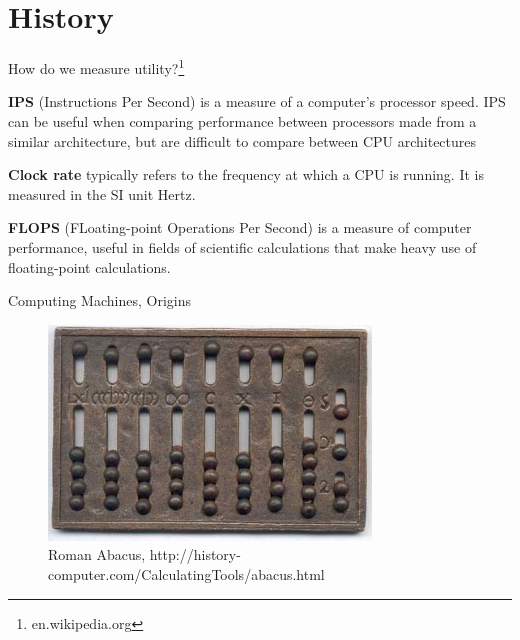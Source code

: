 \documentclass[xcolor=x11names,compress]{beamer}
\renewcommand{\(}{\begin{columns}}
\renewcommand{\)}{\end{columns}}
\newcommand{\<}[1]{\begin{column}{#1}}
\renewcommand{\>}{\end{column}}
\begin{document}
\section{History}
\begin{frame}{How do we measure utility?\footnote{en.wikipedia.org}}

\textbf{IPS} (Instructions Per Second) is a measure of a computer's processor speed. IPS can be useful when comparing performance between processors made from a similar architecture, but are difficult to compare between CPU architectures

\textbf{Clock rate} typically refers to the frequency at which a CPU is running. It is measured in the SI unit Hertz.

\textbf{FLOPS} (FLoating-point Operations Per Second) is a measure of computer performance, useful in fields of scientific calculations that make heavy use of floating-point calculations. 
\end{frame}

\begin{frame}{Computing Machines, Origins}

\begin{figure}
\includegraphics[height=2.25in,clip]{RomanAbacus}
\caption{Roman Abacus, http://history-computer.com/CalculatingTools/abacus.html}
\end{figure}

\end{frame}
\end{document}
